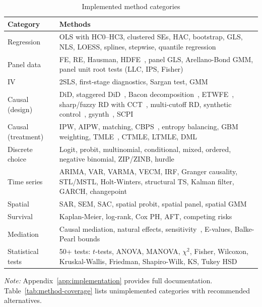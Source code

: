 \begin{table}[htbp]
\centering
\begin{threeparttable}
\caption{Implemented method categories}
\label{tab:method-categories}
\small
\begin{tabular}{lp{9.5cm}}
\toprule
Category & Methods \\
\midrule
Regression & OLS with HC0--HC3, clustered SEs, HAC, bootstrap, GLS, NLS, LOESS, splines, stepwise, quantile regression \\
Panel data & FE, RE, Hausman, HDFE~\citep{Gaure:2013}, panel GLS, Arellano-Bond GMM, panel unit root tests (LLC, IPS, Fisher) \\
IV & 2SLS, first-stage diagnostics, Sargan test, GMM \\
Causal (design) & DiD, staggered DiD~\citep{Callaway+SantAnna:2021}, Bacon decomposition~\citep{Goodman-Bacon:2021}, ETWFE~\citep{Wooldridge:2025}, sharp/fuzzy RD with CCT~\citep{Calonico+etal:2014}, multi-cutoff RD, synthetic control~\citep{Abadie+etal:2010}, gsynth~\citep{Xu:2017}, SCPI~\citep{Cattaneo+etal:2021} \\
Causal (treatment) & IPW, AIPW, matching, CBPS~\citep{Imai+Ratkovic:2014}, entropy balancing, GBM weighting, TMLE~\citep{vanderLaan+Rose:2011}, CTMLE, LTMLE, DML~\citep{Chernozhukov+etal:2018} \\
Discrete choice & Logit, probit, multinomial, conditional, mixed, ordered, negative binomial, ZIP/ZINB, hurdle \\
Time series & ARIMA, VAR, VARMA, VECM, IRF, Granger causality, STL/MSTL, Holt-Winters, structural TS, Kalman filter, GARCH, changepoint \\
Spatial & SAR, SEM, SAC, spatial probit, spatial panel, spatial GMM \\
Survival & Kaplan-Meier, log-rank, Cox PH, AFT, competing risks \\
Mediation & Causal mediation, natural effects, sensitivity~\citep{Cinelli+Hazlett:2020}, E-values, Balke-Pearl bounds \\
Statistical tests & 50+ tests: $t$-tests, ANOVA, MANOVA, $\chi^2$, Fisher, Wilcoxon, Kruskal-Wallis, Friedman, Shapiro-Wilk, KS, Tukey HSD \\
\bottomrule
\end{tabular}
\begin{tablenotes}[flushleft]
\item \emph{Note:} Appendix~\ref{app:implementation} provides full
documentation. Table~\ref{tab:method-coverage} lists unimplemented
categories with recommended alternatives.
\end{tablenotes}
\end{threeparttable}
\end{table}

